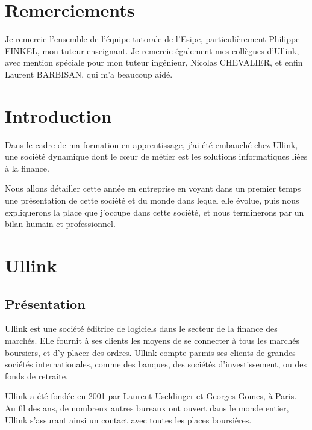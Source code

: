 \documentclass[a4paper, 12pt]{article}
\begin{document}

\pagebreak

\section*{Remerciements}
Je remercie l'ensemble de l'équipe tutorale de l'Esipe, particulièrement Philippe FINKEL, mon tuteur enseignant. Je remercie également mes collègues d'Ullink, avec mention spéciale pour mon tuteur ingénieur, Nicolas CHEVALIER, et enfin Laurent BARBISAN, qui m'a beaucoup aidé.

\pagebreak

\section*{Introduction}

Dans le cadre de ma formation en apprentissage, j'ai été embauché chez Ullink, une société dynamique dont le c\oe{}ur de métier est les solutions informatiques liées à la finance.

Nous allons détailler cette année en entreprise en voyant dans un premier temps une présentation de cette société et du monde dans lequel elle évolue, puis nous expliquerons la place que j'occupe dans cette société, et nous terminerons par un bilan humain et professionnel.
\pagebreak
\tableofcontents
\pagebreak

\section{Ullink}
\subsection{Présentation}
Ullink est une société éditrice de logiciels dans le secteur de la finance des marchés. Elle fournit à ses clients les moyens de se connecter à tous les marchés boursiers, et d'y placer des ordres. Ullink compte parmis ses clients de grandes sociétés internationales, comme des banques, des sociétés d'investissement, ou des fonds de retraite.

Ullink a été fondée en 2001 par Laurent Useldinger et Georges Gomes, à Paris. Au fil des ans, de nombreux autres bureaux ont ouvert dans le monde entier, Ullink s'assurant ainsi un contact avec toutes les places boursières.
\end{document}

